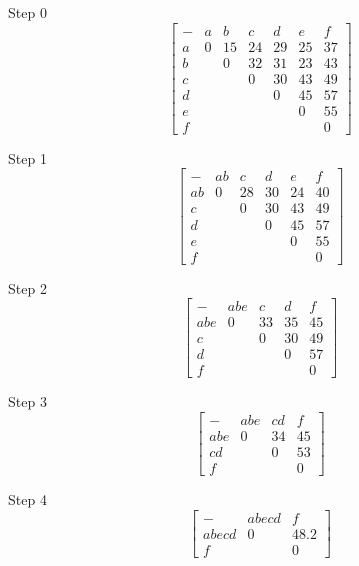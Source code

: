 \documentclass[10pt,a4paper]{article}
\begin{document}
	\begin{center}
		Step 0
		\[\begin{bmatrix}
			- & a & b & c & d & e & f \\
			a & 0 & 15 & 24 & 29 & 25 & 37\\
			b &  & 0 & 32 & 31 & 23 & 43\\
			c &  &  & 0 & 30 & 43 & 49\\
			d &  &  &  & 0 & 45 & 57\\
			e &  &  &  &  & 0 & 55\\
			f &  &  &  &  &  & 0
		\end{bmatrix}\]
		
		\noindent\makebox[\linewidth]{\rule{\paperwidth}{0.4pt}}
		
		Step 1
		\[\begin{bmatrix}
		- & ab & c & d & e & f \\
		ab & 0 & 28 & 30 & 24 & 40\\
		c &  & 0 & 30 & 43 & 49\\
		d &  &  & 0 & 45 & 57\\
		e &  &  &  & 0 & 55\\
		f &  &  &  &  & 0
		\end{bmatrix}\]
		
		\noindent\makebox[\linewidth]{\rule{\paperwidth}{0.4pt}}
		
		Step 2 
		\[\begin{bmatrix}
		- & abe & c & d & f \\
		abe & 0 & 33 & 35 & 45\\
		c &  & 0 & 30 & 49\\
		d &  &  & 0 & 57\\
		f &  &  &  & 0
		\end{bmatrix}\]

		\noindent\makebox[\linewidth]{\rule{\paperwidth}{0.4pt}}
		
		Step 3 
		\[\begin{bmatrix}
		- & abe & cd & f \\
		abe & 0 & 34 & 45\\
		cd &  & 0 & 53\\
		f &  & & 0
		\end{bmatrix}\]
		
		\noindent\makebox[\linewidth]{\rule{\paperwidth}{0.4pt}}
		
		Step 4
		\[\begin{bmatrix}
		- & abecd & f \\
		abecd & 0 & 48.2\\
		f &  & 0
		\end{bmatrix}\]
		
		\noindent\makebox[\linewidth]{\rule{\paperwidth}{0.4pt}}

	\end{center}
\end{document}
